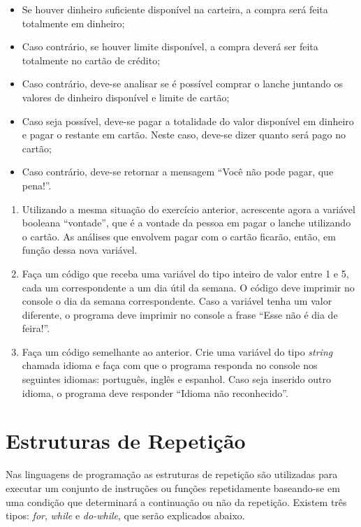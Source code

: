 \documentclass[
]{book}
\providecommand{\tightlist}{%
  \setlength{\itemsep}{0pt}\setlength{\parskip}{0pt}}
\begin{document}
\begin{itemize}
\tightlist
\item
  Se houver dinheiro suficiente disponível na carteira, a compra será feita totalmente em dinheiro;
\item
  Caso contrário, se houver limite disponível, a compra deverá ser feita totalmente no cartão de crédito;
\item
  Caso contrário, deve-se analisar se é possível comprar o lanche juntando os valores de dinheiro disponível e limite de cartão;
\item
  Caso seja possível, deve-se pagar a totalidade do valor disponível em dinheiro e pagar o restante em cartão. Neste caso, deve-se dizer quanto será pago no cartão;
\item
  Caso contrário, deve-se retornar a mensagem ``Você não pode pagar, que pena!''.
\end{itemize}

\begin{enumerate}
\def\labelenumi{\arabic{enumi}.}
\setcounter{enumi}{3}
\tightlist
\item
  Utilizando a mesma situação do exercício anterior, acrescente agora a variável booleana ``vontade'', que é a vontade da pessoa em pagar o lanche utilizando o cartão. As análises que envolvem pagar com o cartão ficarão, então, em função dessa nova variável.
\item
  Faça um código que receba uma variável do tipo inteiro de valor entre 1 e 5, cada um correspondente a um dia útil da semana. O código deve imprimir no console o dia da semana correspondente. Caso a variável tenha um valor diferente, o programa deve imprimir no console a frase ``Esse não é dia de feira!''.
\item
  Faça um código semelhante ao anterior. Crie uma variável do tipo \emph{string} chamada idioma e faça com que o programa responda no console nos seguintes idiomas: português, inglês e espanhol. Caso seja inserido outro idioma, o programa deve responder ``Idioma não reconhecido''.
\end{enumerate}

\hypertarget{estruturas-de-repetiuxe7uxe3o}{%
\chapter{Estruturas de Repetição}\label{estruturas-de-repetiuxe7uxe3o}}

Nas linguagens de programação as estruturas de repetição são utilizadas para executar um conjunto de instruções ou funções repetidamente baseando-se em uma condição que determinará a continuação ou não da repetição. Existem três tipos: \emph{for}, \emph{while} e \emph{do-while}, que serão explicados abaixo.
\end{document}
